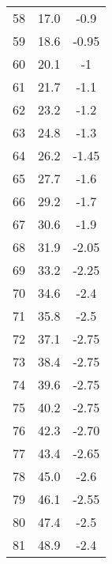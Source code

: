 \begin{table}
\begin{tabular}{S S S}
       58 &  17.0 & -0.9 \\
       59 &  18.6 & -0.95 \\
       60 &  20.1 & -1 \\
       61 &  21.7 & -1.1 \\
       62 &  23.2 & -1.2 \\
       63 &  24.8 & -1.3 \\
       64 &  26.2 & -1.45 \\
       65 &  27.7 & -1.6 \\
       66 &  29.2 & -1.7 \\
       67 &  30.6 & -1.9 \\
       68 &  31.9 & -2.05 \\
       69 &  33.2 & -2.25 \\
       70 &  34.6 & -2.4 \\
       71 &  35.8 & -2.5 \\
       72 &  37.1 & -2.75 \\
       73 &  38.4 & -2.75 \\
       74 &  39.6 & -2.75 \\
       75 &  40.2 & -2.75 \\
       76 &  42.3 & -2.70 \\
       77 &  43.4 & -2.65 \\
       78 &  45.0 & -2.6 \\
       79 &  46.1 & -2.55 \\
       80 &  47.4 & -2.5 \\
       81 &  48.9 & -2.4 \\
        \bottomrule
    \end{tabular}
\end{table}
\hfill
